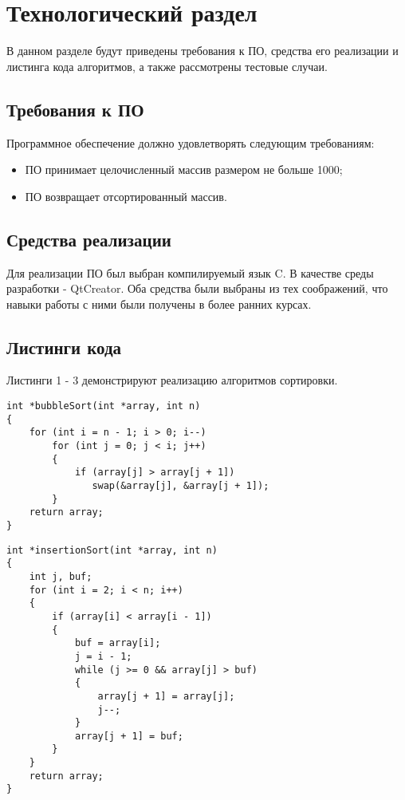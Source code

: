 \chapter{Технологический раздел}

В данном разделе будут приведены требования к ПО, средства его реализации и листинга кода алгоритмов, а также рассмотрены тестовые случаи.

\section{Требования к ПО}

Программное обеспечение должно удовлетворять следующим требованиям:
\begin{itemize}
	\item ПО принимает целочисленный массив размером не больше 1000;
	\item ПО возвращает отсортированный массив.
\end{itemize}

\section{Средства реализации} 

Для реализации ПО был выбран компилируемый язык C. В качестве среды разработки - QtCreator. Оба средства были выбраны из тех соображений, что навыки работы с ними были получены в более ранних курсах.

\section{Листинги кода}

Листинги 1 - 3 демонстрируют реализацию алгоритмов сортировки.

\begin{lstlisting}[label=bubbleSort, caption=Алгоритм сортировки пузырьком]
int *bubbleSort(int *array, int n)
{
    for (int i = n - 1; i > 0; i--)
        for (int j = 0; j < i; j++)
        {
            if (array[j] > array[j + 1])
               swap(&array[j], &array[j + 1]);
        }
    return array;
}
\end{lstlisting}

\begin{lstlisting}[label=insertionSort, caption=Алгоритм сортировки вставками]
int *insertionSort(int *array, int n)
{
    int j, buf;
    for (int i = 2; i < n; i++)
    {
        if (array[i] < array[i - 1])
        {
            buf = array[i];
            j = i - 1;
            while (j >= 0 && array[j] > buf)
            {
                array[j + 1] = array[j];
                j--;
            }
            array[j + 1] = buf;
        }
    }
    return array;
}
\end{lstlisting}

